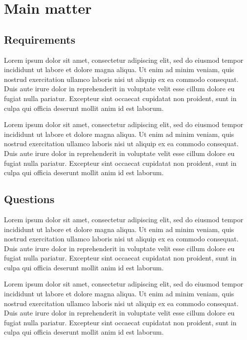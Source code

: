 \documentclass[12pt,a4paper]{article}
\begin{document}
\section{Main matter}

\subsection{Requirements}
Lorem ipsum dolor sit amet, consectetur adipiscing elit, sed do eiusmod tempor incididunt ut labore et dolore magna aliqua. Ut enim ad minim veniam, quis nostrud exercitation ullamco laboris nisi ut aliquip ex ea commodo consequat. Duis aute irure dolor in reprehenderit in voluptate velit esse cillum dolore eu fugiat nulla pariatur. Excepteur sint occaecat cupidatat non proident, sunt in culpa qui officia deserunt mollit anim id est laborum.

Lorem ipsum dolor sit amet, consectetur adipiscing elit, sed do eiusmod tempor incididunt ut labore et dolore magna aliqua. Ut enim ad minim veniam, quis nostrud exercitation ullamco laboris nisi ut aliquip ex ea commodo consequat. Duis aute irure dolor in reprehenderit in voluptate velit esse cillum dolore eu fugiat nulla pariatur. Excepteur sint occaecat cupidatat non proident, sunt in culpa qui officia deserunt mollit anim id est laborum.


\subsection{Questions}

Lorem ipsum dolor sit amet, consectetur adipiscing elit, sed do eiusmod tempor incididunt ut labore et dolore magna aliqua. Ut enim ad minim veniam, quis nostrud exercitation ullamco laboris nisi ut aliquip ex ea commodo consequat. Duis aute irure dolor in reprehenderit in voluptate velit esse cillum dolore eu fugiat nulla pariatur. Excepteur sint occaecat cupidatat non proident, sunt in culpa qui officia deserunt mollit anim id est laborum.

Lorem ipsum dolor sit amet, consectetur adipiscing elit, sed do eiusmod tempor incididunt ut labore et dolore magna aliqua. Ut enim ad minim veniam, quis nostrud exercitation ullamco laboris nisi ut aliquip ex ea commodo consequat. Duis aute irure dolor in reprehenderit in voluptate velit esse cillum dolore eu fugiat nulla pariatur. Excepteur sint occaecat cupidatat non proident, sunt in culpa qui officia deserunt mollit anim id est laborum.
\end{document}
